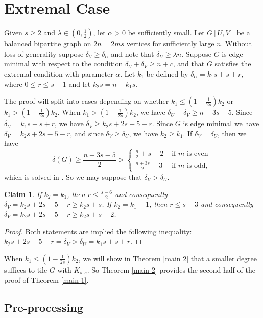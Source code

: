 \documentclass[oneside,12pt]{memoir}
\newtheorem{claim}[theorem]{Claim}
\begin{document}
\section{Extremal Case}\label{extremesection}

Given $s\geq 2$ and $\lambda\in (0,\frac{1}{2})$, let $\alpha>0$ be sufficiently small.  Let $G[U,V]$ be a balanced bipartite graph on $2n=2ms$ vertices for sufficiently large $n$.  Without loss of generality suppose $\delta_V\geq \delta_U$ and note that $\delta_U\geq \lambda n$.  Suppose $G$ is edge minimal with respect to the condition $\delta_U+\delta_V\geq n+c$, and that $G$ satisfies the extremal condition with parameter $\alpha$.  Let $k_1$ be defined by $\delta_U=k_1s+s+r$, where $0\leq r\leq s-1$ and let $k_2s=n-k_1s$.


The proof will split into cases depending on whether $k_1\leq (1-\frac{1}{2s})k_2$ or $k_1> (1-\frac{1}{2s})k_2$.  When $k_1> (1-\frac{1}{2s})k_2$, we have $\delta_U+\delta_V\geq n+3s-5$.  Since $\delta_U=k_1s+s+r$, we have $\delta_V\geq k_2s+2s-5-r$. Since $G$ is edge minimal we have $\delta_V=k_2s+2s-5-r$, and since $\delta_V\geq \delta_U$, we have $k_2\geq k_1$.  If $\delta_V=\delta_U$, then we have $$\delta(G)\geq \frac{n+3s-5}{2}> \left\lbrace \begin{array}{ll} \frac{n}{2}+s-2   & \text{ if } m \text{ is even } \\ \frac {n+3s}{2}-3 & \text{ if } m \text{ is odd, } \end{array} \right. $$ which is solved in \cite{Z}.  So we may suppose that $\delta_V>\delta_U$.  

\begin{claim}\label{k2approxk1}
If $k_2=k_1$, then $r\leq \frac{s-6}{2}$ and consequently $\delta_V=k_2s+2s-5-r\geq k_2s+s$.  If $k_2=k_1+1$, then $r\leq s-3$ and consequently $\delta_V=k_2s+2s-5-r\geq k_2s+s-2$.
\end{claim}

\begin{proof}
Both statements are implied the following inequality: $k_2s+2s-5-r=\delta_V>\delta_U=k_1s+s+r$.
\end{proof}

When $k_1\leq (1-\frac{1}{2s})k_2$, we will show in Theorem \ref{main 2} that a smaller degree suffices to tile $G$ with $K_{s,s}$.  So Theorem \ref{main 2} provides the second half of the proof of Theorem \ref{main 1}.


\subsection{Pre-processing}\label{preprocesssection}
\end{document}
